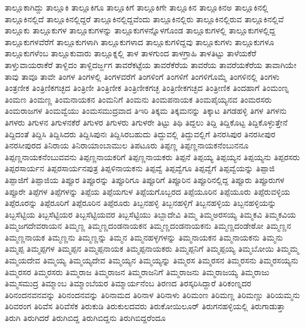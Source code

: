 {ತಾಲ್ಲೂಕಾಗಿದ್ದು
ತಾಲ್ಲೂಕಿ
ತಾಲ್ಲೂಕಿಗೂ
ತಾಲ್ಲೂಕಿಗೆ
ತಾಲ್ಲೂಕಿಗೇ
ತಾಲ್ಲೂಕಿನ
ತಾಲ್ಲೂಕಿನಅ
ತಾಲ್ಲೂಕಿನಲ್ಲಿ
ತಾಲ್ಲೂಕಿನಲ್ಲಿದೆ
ತಾಲ್ಲೂಕಿನಲ್ಲಿದ್ದರೆ
ತಾಲ್ಲೂಕಿನಲ್ಲಿದ್ದವೆಂದು
ತಾಲ್ಲೂಕಿನಲ್ಲಿರು
ತಾಲ್ಲೂಕಿನಲ್ಲಿರುವ
ತಾಲ್ಲೂಕಿನಲ್ಲಿವೆ
ತಾಲ್ಲೂಕು
ತಾಲ್ಲೂಕುಗಳ
ತಾಲ್ಲೂಕುಗಳನ್ನು
ತಾಲ್ಲೂಕುಗಳನ್ನೊಳಗೊಂಡ
ತಾಲ್ಲೂಕುಗಳಲ್ಲಿ
ತಾಲ್ಲೂಕುಗಳಲ್ಲಿದ್ದ
ತಾಲ್ಲೂಕುಗಳವೆರೆಗೆ
ತಾಲ್ಲೂಕುಗಳಾಗಿ
ತಾಲ್ಲೂಕುಗಳಾದ
ತಾಲ್ಲೂಕುಗಳಿದ್ದವು
ತಾಲ್ಲೂಕುಗಳು
ತಾಲ್ಲೂಕುಗಳೂ
ತಾಲ್ಲೂಕುಗಳೆಂಬ
ತಾಲ್ಲೂಕುವಾರು
ತಾಲ್ಲೂಕ್ನಲ್ಲಿ
ತಾಳ
ತಾಳಗುಂದ
ತಾಳಗ್ರಾಹಿ
ತಾಳತಿಟ್ಟು
ತಾಳೆಯಕೆರೆ
ತಾಳ್ತುವಾಯರಾಕೆರೆ
ತಾಳ್ದಿದಂ
ತಾಳ್ದಿದರ್ಜ್ಜಗ
ತಾವರೆಕಟ್ಟೆಯ
ತಾವರೆಕೆರೆಯ
ತಾವರೆಯ
ತಾವರೆಯಕೆರೆಯ
ತಾವಾಗಿಯೇ
ತಾವು
ತಾವೂ
ತಾವೇ
ತಿಂಗಳ
ತಿಂಗಳಲ್ಲಿ
ತಿಂಗಳವರೆಗೆ
ತಿಂಗಳಿಂಗೆ
ತಿಂಗಳಿಗೆ
ತಿಂಗಳಿಗೊಮ್ಮೆ
ತಿಂಗಳಿನಲ್ಲಿ
ತಿಂಗಳು
ತಿಂತ್ರಣೀಕ
ತಿಂತ್ರಿಣಿಕಗಚ್ಛದ
ತಿಂತ್ರಿಣೀ
ತಿಂತ್ರಿಣೀಕ
ತಿಂತ್ರಿಣೀಕಗಚ್ಛ
ತಿಂತ್ರಿಣೀಕಗಚ್ಛದ
ತಿಂತ್ರೀಣಿಕ
ತಿಂದಹಾಗೆ
ತಿಂಮಂಣ್ನ
ತಿಂಮಣ
ತಿಂಮಣ್ಣ
ತಿಂಮನಾಯಕನ
ತಿಂಮನಿಗೆ
ತಿಂಮನು
ತಿಂಮಪನಾಯಕ
ತಿಂಮಪೈಯ್ಯನವ
ತಿಂಮರಸರು
ತಿಂಮರಾಜಗಳ
ತಿಂಮವ್ವೆಯು
ತಿಂಮಸಮುದ್ರವಾದ
ತಿಇರಿ
ತಿಕ್ಕಮ
ತಿಕ್ಕಮನನ್ನು
ತಿಕ್ಕಾಟ
ತಿಗಡಹಳ್ಳಿ
ತಿಗಳ
ತಿಗಳನು
ತಿಗಳರು
ತಿಗುಳನ
ತಿಗುಳನಕೆರೆ
ತಿಗುಳರ
ತಿಗುಳರು
ತಿಗುಳರೇ
ತಿಟ್ಟು
ತಿಥಿ
ತಿದ್ದಲು
ತಿದ್ದಿ
ತಿದ್ದಿಕೊಟ್ಟ
ತಿದ್ದಿಕೊಳ್ಳುತ್ತೇನೆ
ತಿದ್ದಿದಂತೆ
ತಿದ್ದಿಸಿ
ತಿದ್ದಿಸಿದರು
ತಿದ್ದಿಸಿಪುನಃ
ತಿದ್ದಿಸಿರಬಹುದು
ತಿದ್ದುವಲ್ಲಿ
ತಿದ್ದುವಲ್ಲಿಗೆ
ತಿನರಸಿಪುರ
ತಿನರಸೀಪುರ
ತಿನರಸೀಪುರದ
ತಿನಿರಾಯ
ತಿನಿರಾಯಾಂಬಾಮುಲ
ತಿಪಟೂರು
ತಿಪ್ಪಣ್ಣ
ತಿಪ್ಪಣ್ಣನಾಯಕನೆಂಬುನನೂ
ತಿಪ್ಪಣ್ಣನಾಯಕನೆಂಬುವವನು
ತಿಪ್ಪಣ್ಣನಾಯಕರಿಗೆ
ತಿಪ್ಪಣ್ಣನಾಯಕರು
ತಿಪ್ಪನೆ
ತಿಪ್ಪಯ್ಯ
ತಿಪ್ಪಯ್ಯನ
ತಿಪ್ಪಯ್ಯನು
ತಿಪ್ಪರಸರು
ತಿಪ್ಪರಸಾರ್ಯನ
ತಿಪ್ಪರಸಾರ್ಯನಪುತ್ರ
ತಿಪ್ಪಳಿನಾಯಕನು
ತಿಪ್ಪವ್ವೆ
ತಿಪ್ಪವ್ವೆಗೂ
ತಿಪ್ಪವ್ವೆಗೆ
ತಿಪ್ಪವ್ವೆಯನ್ನು
ತಿಪ್ಪಾಜಿ
ತಿಪ್ಪಾಜಿಗೆ
ತಿಪ್ಪಾಜಿಯ
ತಿಪ್ಪೂರ
ತಿಪ್ಪೂರನ್ನು
ತಿಪ್ಪೂರಿಗೂ
ತಿಪ್ಪೂರಿಗೆ
ತಿಪ್ಪೂರಿನ
ತಿಪ್ಪೂರಿನಲ್ಲಿದ್ದ
ತಿಪ್ಪೂರು
ತಿಪ್ಪೂರುಗಳ
ತಿಪ್ಪೂರೇ
ತಿಪ್ಪೆಗಳ
ತಿಪ್ಪೆಗಳನ್ನು
ತಿಪ್ಪೆಯ
ತಿಪ್ಪೆಯಗುಳ
ತಿಪ್ಪೆಯಗೊಬ್ಬರದ
ತಿಪ್ಪೆಯೂರಿನ
ತಿಪ್ಪೆಯೂರು
ತಿಪ್ಪೆರುವಳ್ಳಿಯ
ತಿಪ್ಪೆರೂರನ್ನು
ತಿಪ್ಪೆರೂರಿಗೆ
ತಿಪ್ಪೆರೂರಿನ
ತಿಪ್ಪೆರೂರು
ತಿಬ್ಬನಹಳ್ಳಿ
ತಿಬ್ಬನಹಳ್ಳಿಗೆ
ತಿಬ್ಬನಹಳ್ಳಿಯ
ತಿಬ್ಬನಹಳ್ಳಿಯನ್ನು
ತಿಬ್ಬಸೆಟ್ಟಿಯ
ತಿಬ್ಬಸೆಟ್ಟಿಯರ
ತಿಬ್ಬಸೆಟ್ಟಿಯವರ
ತಿಬ್ಬಸೆಟ್ಟಿಯು
ತಿಬ್ಬಾದೇವಿ
ತಿಮ್ಮ
ತಿಮ್ಮಅರಸಯ್ಯ
ತಿಮ್ಮಕವಿ
ತಿಮ್ಮಕವಿಯ
ತಿಮ್ಮಜಗದೇವರಾಯನ
ತಿಮ್ಮಣ್ಣ
ತಿಮ್ಮಣ್ಣದಂಡನಾಯಕನ
ತಿಮ್ಮಣ್ಣದಂಡನಾಯಕನು
ತಿಮ್ಮಣ್ಣದಂಡೇಠೋ
ತಿಮ್ಮಣ್ಣನ
ತಿಮ್ಮಣ್ಣನಾಯಕ
ತಿಮ್ಮಣ್ಣನು
ತಿಮ್ಮಣ್ಣನ್ನು
ತಿಮ್ಮನ
ತಿಮ್ಮನಹಳ್ಳಗಳನ್ನು
ತಿಮ್ಮನಾಯಕನ
ತಿಮ್ಮನಾಯಕನು
ತಿಮ್ಮನು
ತಿಮ್ಮಪ್ಪ
ತಿಮ್ಮಪ್ಪಗಳ
ತಿಮ್ಮಪ್ಪನ
ತಿಮ್ಮಪ್ಪನಾಯಕ
ತಿಮ್ಮಪ್ಪನಾಯಕರು
ತಿಮ್ಮಪ್ಪನಿಗೆ
ತಿಮ್ಮಪ್ಪಯ್ಯ
ತಿಮ್ಮಬೋಯಿ
ತಿಮ್ಮಮ್ಮ
ತಿಮ್ಮಯದೇವ
ತಿಮ್ಮಯ್ಯ
ತಿಮ್ಮಯ್ಯದೇವ
ತಿಮ್ಮಯ್ಯನ
ತಿಮ್ಮಯ್ಯನ್ನು
ತಿಮ್ಮರಸ
ತಿಮ್ಮರಸನ
ತಿಮ್ಮರಸನು
ತಿಮ್ಮರಸಯ್ಯನು
ತಿಮ್ಮರಸರ
ತಿಮ್ಮರಸರು
ತಿಮ್ಮರಾಜ
ತಿಮ್ಮರಾಜನ
ತಿಮ್ಮರಾಜನಿಗೆ
ತಿಮ್ಮರಾಜನು
ತಿಮ್ಮರಾಜಯ್ಯ
ತಿಮ್ಮರಾಜು
ತಿಮ್ಮಸಮುದ್ರ
ತಿಮ್ಮಾಂಬ
ತಿಮ್ಮಾಂಬೆಯರ
ತಿಮ್ಮಾರ್ಯನೆಂಬ
ತಿರಣದ
ತಿರಸ್ಕರಿಸಿದ್ದಾರೆ
ತಿರಿಕಂಣ್ನದರ
ತಿರಿನಂದನವನವನ್ನು
ತಿರಿನಂದನವನ್ನು
ತಿರಿನಾಮದ
ತಿರಿನಾಳ
ತಿರಿನಾಳು
ತಿರಿಮಂಣ
ತಿರಿಮಣ್ಣ
ತಿರಿಮಣ್ಣು
ತಿರಿಯಮ್ಮನು
ತಿರಿವರಂಗ
ತಿರಿವೆಸ
ತಿರಿವೆಸೆಕ
ತಿರುಕುಡಿ
ತಿರುಕುಲದವರು
ತಿರುಕೋಯಿಲೂರ್
ತಿರುಗನಹಳ್ಳಿಯಲ್ಲಿ
ತಿರುಗಾಡುತ್ತಾ
ತಿರುಗಿ
ತಿರುಗಿದರೆ
ತಿರುಗಿಬಿದ್ದ
ತಿರುಗಿಬಿದ್ದನು
ತಿರುಗಿಬಿದ್ದರೆಂದೂ
}
